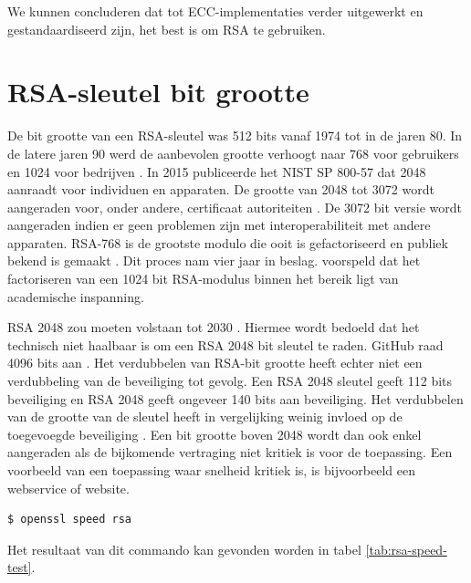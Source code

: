We kunnen concluderen dat tot ECC-implementaties verder uitgewerkt en
gestandaardiseerd zijn, het best is om RSA te gebruiken.

\section{RSA-sleutel bit grootte}
\label{sec:rsa-sleutel-bit-grootte}

De bit grootte van een RSA-sleutel was 512 bits vanaf 1974 tot in de jaren 80.
In de latere jaren 90 werd de aanbevolen grootte verhoogt naar 768 voor
gebruikers en 1024 voor bedrijven \autocite{OriginalRSAKeySizeRecommendations}.
In 2015 publiceerde het NIST SP 800-57 dat 2048 aanraadt voor individuen en
apparaten. De grootte van 2048 tot 3072 wordt aangeraden voor, onder andere,
certificaat autoriteiten
\autocite{NISTKeyManagementRecommendationApplicationSpecific}. De 3072 bit
versie wordt aangeraden indien er geen problemen zijn met interoperabiliteit met
andere apparaten. RSA-768 is de grootste modulo die ooit is gefactoriseerd en
publiek bekend is gemaakt \autocite{FactorizationOf768BitRSA}. Dit proces nam
vier jaar in beslag. \textcite{FactorizationOf768BitRSA} voorspeld dat het
factoriseren van een 1024 bit RSA-modulus binnen het bereik ligt van academische
inspanning.

RSA 2048 zou moeten volstaan tot 2030
\autocite{NISTKeyManagementRecommendationGeneral}. Hiermee wordt bedoeld dat het
technisch niet haalbaar is om een RSA 2048 bit sleutel te raden. GitHub raad
4096 bits aan \autocite{GithubGeneratingANewGPGKey}. Het verdubbelen van RSA-bit
grootte heeft echter niet een verdubbeling van de beveiliging tot gevolg. Een
RSA 2048 sleutel geeft 112 bits beveiliging en RSA 2048 geeft ongeveer 140 bits
aan beveiliging. Het verdubbelen van de grootte van de sleutel heeft in
vergelijking weinig invloed op de toegevoegde beveiliging \autocite{GnuPGFAQ}.
Een bit grootte boven 2048 wordt dan ook enkel aangeraden als de bijkomende
vertraging niet kritiek is voor de toepassing. Een voorbeeld van een toepassing
waar snelheid kritiek is, is bijvoorbeeld een webservice of website.

\begin{lstlisting}[language=bash, caption={Commando om de snelheid van RSA te
testen}]
$ openssl speed rsa
\end{lstlisting}

Het resultaat van dit commando kan gevonden worden in tabel \ref{tab:rsa-speed-test}.

